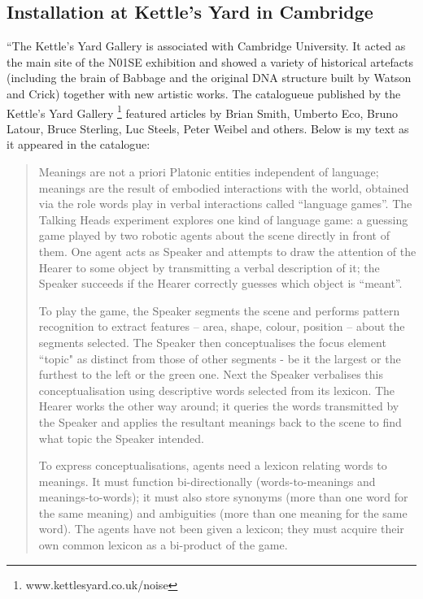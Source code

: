 \subsection{Installation at Kettle's Yard in Cambridge} 

``The Kettle's Yard Gallery is associated with Cambridge University. It acted as the main site of the N01SE exhibition 
and showed a variety of historical artefacts (including the brain of Babbage and the original DNA structure built by 
Watson and Crick) together with new artistic works. The catalogueue published by the Kettle's Yard 
Gallery \footnote{www.kettlesyard.co.uk/noise} featured articles by Brian Smith, Umberto Eco, Bruno Latour, 
Bruce Sterling, Luc Steels, Peter Weibel and others. Below is my text as it appeared in the catalogue: 
\begin{quotation}
Meanings are not a priori Platonic entities independent of language; meanings are the result of embodied interactions with the world, obtained via the role words play in verbal interactions called ``language games''. The Talking Heads experiment explores one kind of language game: a guessing game played by two robotic agents about the scene directly in front of them. One agent acts as Speaker and attempts to draw the attention of the Hearer to some object by transmitting a verbal description of it; the Speaker succeeds if the Hearer correctly guesses which object is ``meant''.

To play the game, the Speaker segments the scene and performs pattern recognition to extract features -- area, shape, colour, position -- about the segments selected. The Speaker then conceptualises the focus element ``topic" as distinct from those of other segments - be it the largest or the furthest to the left or the green one. Next the Speaker verbalises this conceptualisation using descriptive words selected from its lexicon. The Hearer works the other way around; it queries the words transmitted by the Speaker and applies the resultant meanings back to the scene to find what topic the Speaker intended.

To express conceptualisations, agents need a lexicon relating words to meanings. It must function 
bi-directionally (words-to-meanings and meanings-to-\linebreak[4] words); it must also store synonyms (more than one word for the same meaning) and ambiguities (more than one meaning for the same word). The agents have not been given a lexicon; they must acquire their own common lexicon as a bi-product of the game.


\end{quotation}
